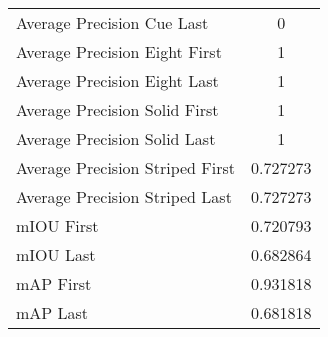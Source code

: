 \begin{figure}
\begin{subfigure}[b]{0.49\textwidth}
\begin{tabular}{|l|c|}
        Average Precision Cue Last & 0 \\
        Average Precision Eight First & 1 \\
        Average Precision Eight Last & 1 \\
        Average Precision Solid First & 1 \\
        Average Precision Solid Last & 1 \\
        Average Precision Striped First & 0.727273 \\
        Average Precision Striped Last & 0.727273 \\
        \hline
        mIOU First & 0.720793 \\
        mIOU Last & 0.682864 \\
        mAP First & 0.931818 \\
        mAP Last & 0.681818 \\
        \hline
    \end{tabular}    
\end{subfigure}
\end{figure}


